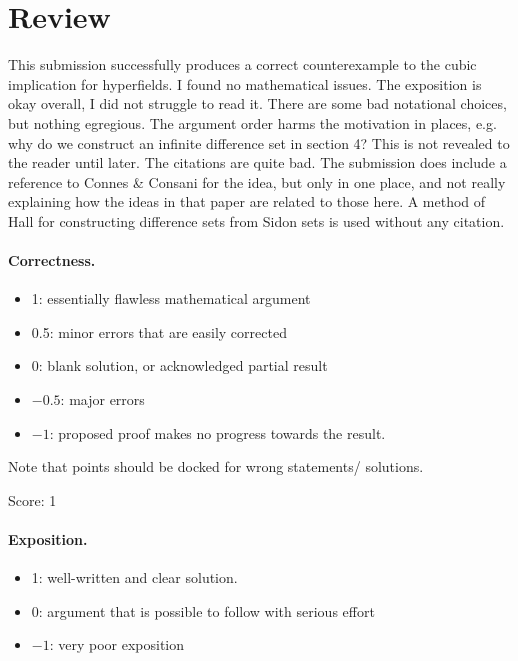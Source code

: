 \documentclass[11pt]{article}
\begin{document}
\maketitle

\section{Review}
{\color{gray} 

This submission successfully produces a correct counterexample to the cubic implication for hyperfields. I found no mathematical issues. The exposition is okay overall, I did not struggle to read it. There are some bad notational choices, but nothing egregious. The argument order harms the motivation in places, e.g. why do we construct an infinite difference set in section 4? This is not revealed to the reader until later. The citations are quite bad. The submission does include a reference to Connes \& Consani for the idea, but only in one place, and not really explaining how the ideas in that paper are related to those here. A method of Hall for constructing difference sets from Sidon sets is used without any citation.
}


\paragraph{Correctness.}
\begin{itemize}
	\item  1: essentially flawless mathematical argument
	\item  0.5: minor errors that are easily corrected
	\item  0: blank solution, or acknowledged partial result
	\item  $-0.5$: major errors
	\item  $-1$: proposed proof makes no progress towards the result.
\end{itemize}
Note that points should be docked for wrong statements/ solutions.

\noindent Score: 1

\paragraph{Exposition.}
\begin{itemize}
	\item  1: well-written and clear solution.
	\item  0: argument that is possible to follow with serious effort
	\item  $-1$: very poor exposition
\end{itemize}
\end{document}

